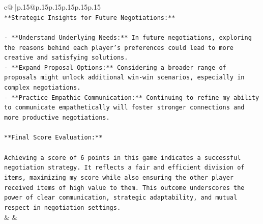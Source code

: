 \documentclass{article}
\begin{document}
{\begin{supertabular}{c@{$\;$}|p{.15\linewidth}@{}p{.15\linewidth}p{.15\linewidth}p{.15\linewidth}p{.15\linewidth}p{.15\linewidth}}
{{{\\ 
\texttt{**Strategic Insights for Future Negotiations:**} \\
\\ 
\texttt{{-} **Understand Underlying Needs:** In future negotiations, exploring the reasons behind each player's preferences could lead to more creative and satisfying solutions.} \\
\texttt{{-} **Expand Proposal Options:** Considering a broader range of proposals might unlock additional win{-}win scenarios, especially in complex negotiations.} \\
\texttt{{-} **Practice Empathic Communication:** Continuing to refine my ability to communicate empathetically will foster stronger connections and more productive negotiations.} \\
\\ 
\texttt{**Final Score Evaluation:**} \\
\\ 
\texttt{Achieving a score of 6 points in this game indicates a successful negotiation strategy. It reflects a fair and efficient division of items, maximizing my score while also ensuring the other player received items of high value to them. This outcome underscores the power of clear communication, strategic adaptability, and mutual respect in negotiation settings.} \\
            }
        }
    }
    & & \\ \\


\end{supertabular}}
\end{document}
